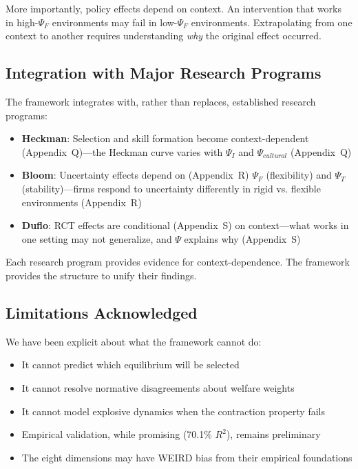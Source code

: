 \documentclass[12pt,a4paper]{article}
\begin{document}
More importantly, policy effects depend on context. An intervention that works in high-$\Psi_F$ environments may fail in low-$\Psi_F$ environments. Extrapolating from one context to another requires understanding \emph{why} the original effect occurred.

\subsection{Integration with Major Research Programs}

The framework integrates with, rather than replaces, established research programs:

\begin{itemize}
    \item \textbf{Heckman}: Selection and skill formation become context-dependent (Appendix~Q)---the Heckman curve varies with $\Psi_I$ and $\Psi_{cultural}$ (Appendix~Q)
    
    \item \textbf{Bloom}: Uncertainty effects depend on (Appendix~R) $\Psi_F$ (flexibility) and $\Psi_T$ (stability)---firms respond to uncertainty differently in rigid vs. flexible environments (Appendix~R)
    
    \item \textbf{Duflo}: RCT effects are conditional (Appendix~S) on context---what works in one setting may not generalize, and $\Psi$ explains why (Appendix~S)
\end{itemize}

Each research program provides evidence for context-dependence. The framework provides the structure to unify their findings.

\subsection{Limitations Acknowledged}

We have been explicit about what the framework cannot do:
\begin{itemize}
  \item It cannot predict which equilibrium will be selected
  \item It cannot resolve normative disagreements about welfare weights
  \item It cannot model explosive dynamics when the contraction property fails
  \item Empirical validation, while promising (70.1\% $R^2$), remains preliminary
  \item The eight dimensions may have WEIRD bias from their empirical foundations
\end{itemize}
\end{document}
